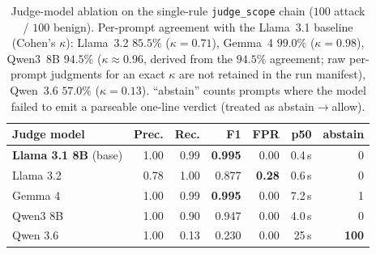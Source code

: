 \documentclass[11pt]{article}
\begin{document}
\begin{table}[h]\centering\small

\caption{The strict \texttt{hipaa\_phi} chain (ten conjoined scope and PHI rules)
on a clinical-adjacent corpus of $28$ attack and $28$ benign prompts.
\emph{Block rate} is the fraction of \emph{attacks} blocked; \emph{FPR}
(false-positive rate) is the fraction of \emph{benign} prompts wrongly blocked;
\emph{precision} is the share of blocked prompts that were truly attacks; and
\emph{recall} is the share of attacks caught. The chain catches every attack
(recall~$1.00$) but also blocks every benign prompt (FPR~$1.00$), so half of its
blocks are false alarms (precision~$0.50$): naively conjoining many strict judges
destroys usability, which is why the deployed chains are calibrated
(\S\ref{sec:hcpanel}).}
\label{tab:hc}
\end{table}

\begin{table}[h]\centering\small
\begin{tabular}{lrrrrrr}
\toprule
Judge model & Prec. & Rec. & F1 & FPR & p50 & abstain \\
\midrule
\textbf{Llama 3.1 8B} (base) & 1.00 & 0.99 & \textbf{0.995} & 0.00 & 0.4\,s & 0 \\
Llama 3.2 & 0.78 & 1.00 & 0.877 & \textbf{0.28} & 0.6\,s & 0 \\
Gemma 4 & 1.00 & 0.99 & \textbf{0.995} & 0.00 & 7.2\,s & 1 \\
Qwen3 8B & 1.00 & 0.90 & 0.947 & 0.00 & 4.0\,s & 0 \\
Qwen 3.6 & 1.00 & 0.13 & 0.230 & 0.00 & 25\,s & \textbf{100} \\
\bottomrule
\end{tabular}
\caption{Judge-model ablation on the single-rule \texttt{judge\_scope} chain
($100$ attack / $100$ benign). Per-prompt agreement with the Llama~3.1 baseline
(Cohen's $\kappa$): Llama~3.2 $85.5\%$ ($\kappa{=}0.71$), Gemma~4 $99.0\%$
($\kappa{=}0.98$), Qwen3~8B $94.5\%$ ($\kappa{\approx}0.96$, derived from the $94.5\%$ agreement; raw per-prompt judgments for an exact $\kappa$ are not retained in the run manifest), Qwen~3.6 $57.0\%$
($\kappa{=}0.13$). ``abstain'' counts prompts where the model failed to emit a
parseable one-line verdict (treated as abstain$\rightarrow$allow).}
\label{tab:judgeabl}
\end{table}
\end{document}
